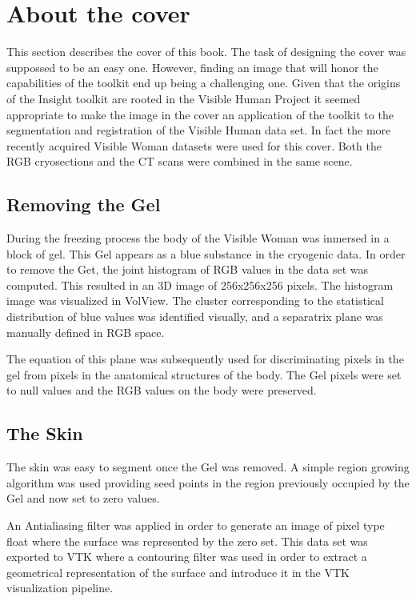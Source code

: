 \section*{About the cover}

This section describes the cover of this book. The task of designing the cover
was suppossed to be an easy one. However, finding an image that will honor the
capabilities of the toolkit end up being a challenging one. Given that the
origins of the Insight toolkit are rooted in the Visible Human Project it
seemed appropriate to make the image in the cover an application of the toolkit
to the segmentation and registration of the Visible Human data set. In fact the
more recently acquired Visible Woman datasets were used for this cover.  Both
the RGB cryosections and the CT scans were combined in the same scene.

\subsection*{Removing the Gel}

During the freezing process the body of the Visible Woman was inmersed in a
block of gel. This Gel appears as a blue substance in the cryogenic data.  In
order to remove the Get, the joint histogram of RGB values in the data set was
computed. This resulted in an 3D image of 256x256x256 pixels. The histogram
image was visualized in VolView. The cluster corresponding to the statistical
distribution of blue values was identified visually, and a separatrix plane was
manually defined in RGB space.

The equation of this plane was subsequently used for discriminating pixels in
the gel from pixels in the anatomical structures of the body. The Gel pixels
were set to null values and the RGB values on the body were preserved.

\subsection*{The Skin}

The skin was easy to segment once the Gel was removed. A simple region growing
algorithm was used providing seed points in the region previously occupied by
the Gel and now set to zero values. 

An Antialiasing filter was applied in order to generate an image of pixel type
float where the surface was represented by the zero set. This data set was
exported to VTK where a contouring filter was used in order to extract a
geometrical representation of the surface and introduce it in the VTK
visualization pipeline.


